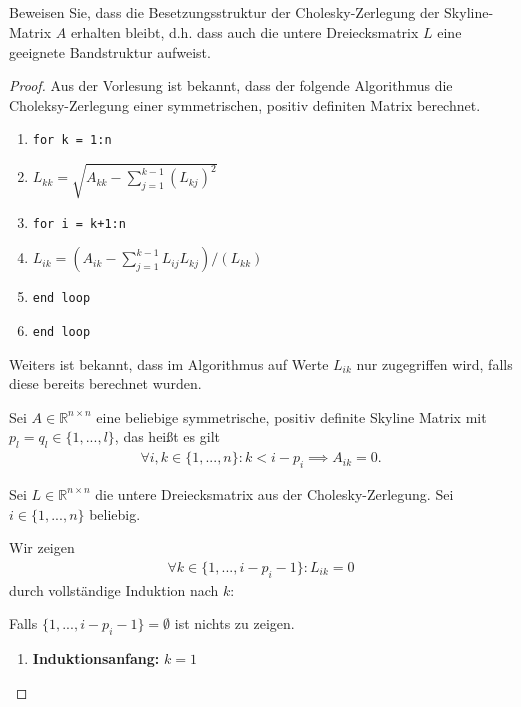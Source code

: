 \documentclass[titlepage]{article}
\begin{document}
\subsection{}
Beweisen Sie, dass die Besetzungsstruktur der Cholesky-Zerlegung der Skyline-Matrix $A$ erhalten bleibt, d.h. dass auch die untere Dreiecksmatrix $L$ eine geeignete Bandstruktur aufweist.

\begin{proof}
	Aus der Vorlesung ist bekannt, dass der folgende Algorithmus die Choleksy-Zerlegung einer symmetrischen, positiv definiten Matrix berechnet.
	\begin{enumerate}[label={(\arabic*)}]
		\item \texttt{for k = 1:n}
		\item \hspace{5mm} $L_{kk} = \sqrt{A_{kk} - \sum_{j=1}^{k-1}(L_{kj})^2}$
		\item \hspace{5mm} \texttt{for i = k+1:n}
		\item \hspace{10mm} $L_{ik} = (A_{ik} - \sum_{j=1}^{k-1}L_{ij}L_{kj})/(L_{kk})$
		\item \hspace{5mm} \texttt{end loop}
		\item \texttt{end loop}
	\end{enumerate}

	Weiters ist bekannt, dass im Algorithmus auf Werte $L_{ik}$ nur zugegriffen wird, falls diese bereits berechnet wurden.
	
	Sei $A \in \mathbb{R}^{n\times n}$ eine beliebige symmetrische, positiv definite Skyline Matrix mit $p_l = q_l \in \{1, ..., l\}$, das heißt es gilt
	\begin{align*}
		\forall i, k \in \{1, ..., n\}: k < i - p_i \implies A_{ik} = 0.
	\end{align*}
	
	Sei $L \in \mathbb{R}^{n\times n}$ die untere Dreiecksmatrix aus der Cholesky-Zerlegung. Sei $i \in \{1, ..., n\}$ beliebig.
	
	Wir zeigen
	\begin{align*}
		\forall k \in \{1, ..., i - p_i - 1\}: L_{ik} = 0
	\end{align*}
	durch vollständige Induktion nach $k$:
	
	Falls $\{1, ..., i - p_i - 1\} = \emptyset$ ist nichts zu zeigen.
	
	\begin{enumerate}
		\item \textbf{Induktionsanfang:} $k=1$
		

\end{enumerate}
\end{proof}
\end{document}
